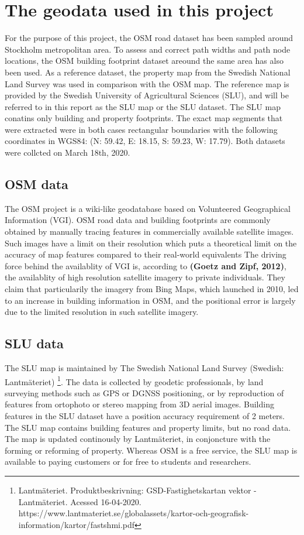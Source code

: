 \documentclass{kththesis}
\begin{document}
\section{The geodata used in this project}

For the purpose of this project, the OSM road dataset has been sampled around Stockholm metropolitan area.
To assess and correct path widths and path node locations, the OSM building footprint dataset areound the same area has also been used.
As a reference dataset, the property map from the Swedish National Land Survey was used in comparison with the OSM map.
The reference map is provided by the Swedish University of Agricultural Sciences (SLU), and will be referred to in this report as the SLU map or the SLU dataset.
The SLU map conatins only building and property footprints.
The exact map segments that were extracted were in both cases rectangular boundaries with the following coordinates in WGS84: (N: 59.42, E: 18.15, S: 59.23, W: 17.79).
Both datasets were collcted on March 18th, 2020.

\subsection{OSM data}

The OSM project is a wiki-like geodatabase based on Volunteered Geographical Information (VGI).
OSM road data and building footprints are commonly obtained by manually tracing features in commercially available satellite images.
Such images have a limit on their resolution which puts a theoretical limit on the accuracy of map features compared to their real-world equivalents
The driving force behind the availablity of VGI is, according to \textbf{(Goetz and Zipf, 2012)}, the availablity of high resolution satellite imagery to private individuals.
They claim that particularily the imagery from Bing Maps, which launched in 2010, led to an increase in building information in OSM, and the positional error is largely due to the limited resolution in such satellite imagery.

\subsection{SLU data}

The SLU map is maintained by The Swedish National Land Survey (Swedish: Lantmäteriet)
\footnote{Lantmäteriet. Produktbeskrivning: GSD-Fastighetskartan vektor - Lantmäteriet. Acessed 16-04-2020. https://www.lantmateriet.se/globalassets/kartor-och-geografisk-information/kartor/fastshmi.pdf}.
The data is collected by geodetic professionals, by land surveying methods such as GPS or DGNSS positioning, or by reproduction of features from ortophoto or stereo mapping from 3D aerial images.
Building features in the SLU dataset have a position accuracy requirement of 2 meters.
The SLU map contains building features and property limits, but no road data.
The map is updated continously by Lantmäteriet, in conjoncture with the forming or reforming of property.
Whereas OSM is a free service, the SLU map is available to paying customers or for free to students and researchers.
\end{document}
